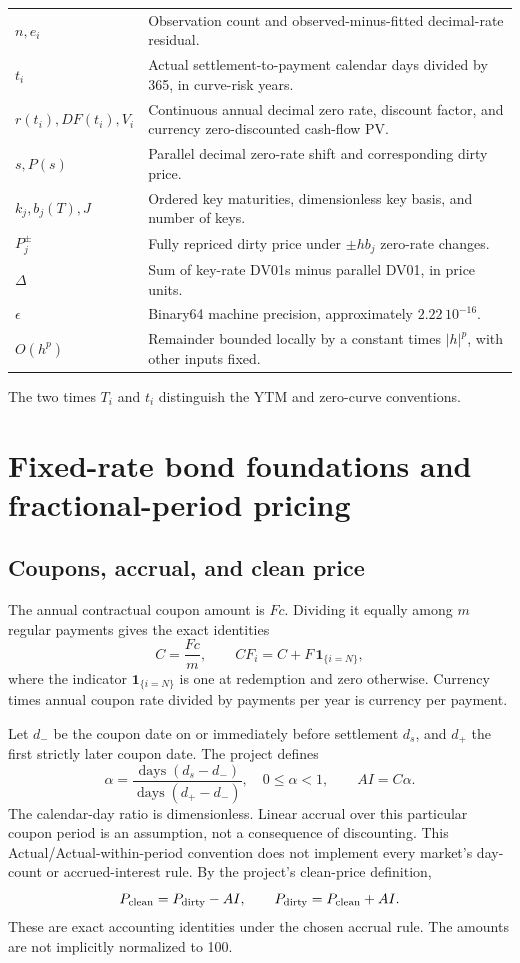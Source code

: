 \documentclass[12pt,a4paper]{article}
\begin{document}
\begin{longtable}{@{}p{}p{}@{}}
$n,e_i$ & Observation count and observed-minus-fitted decimal-rate residual.\\
$t_i$ & Actual settlement-to-payment calendar days divided by 365, in curve-risk years.\\
$r(t_i),DF(t_i),V_i$ & Continuous annual decimal zero rate, discount factor, and currency zero-discounted cash-flow PV.\\
$s,P(s)$ & Parallel decimal zero-rate shift and corresponding dirty price.\\
$k_j,b_j(T),J$ & Ordered key maturities, dimensionless key basis, and number of keys.\\
$P_j^\pm$ & Fully repriced dirty price under $\pm h b_j$ zero-rate changes.\\
$\Delta$ & Sum of key-rate DV01s minus parallel DV01, in price units.\\
$\epsilon$ & Binary64 machine precision, approximately $2.22\,10^{-16}$.\\
$O(h^p)$ & Remainder bounded locally by a constant times $|h|^p$, with other inputs fixed.\\
\bottomrule
\end{longtable}
\normalsize
The two times $T_i$ and $t_i$ distinguish the YTM and zero-curve conventions.

\section{Fixed-rate bond foundations and fractional-period pricing}
\subsection{Coupons, accrual, and clean price}
The annual contractual coupon amount is $Fc$. Dividing it equally among
$m$ regular payments gives the exact identities
\begin{equation}
 C=\frac{Fc}{m},\qquad CF_i=C+F\,\mathbf 1_{\{i=N\}},
\end{equation}
where the indicator $\mathbf 1_{\{i=N\}}$ is one at redemption and zero
otherwise. Currency times annual coupon rate divided by payments per year
is currency per payment.

Let $d_-$ be the coupon date on or immediately before settlement $d_s$,
and $d_+$ the first strictly later coupon date. The project defines
\begin{equation}
 \alpha=\frac{\operatorname{days}(d_s-d_-)}
                   {\operatorname{days}(d_+-d_-)},\quad
 0\leq\alpha<1,\qquad AI=C\alpha.
\end{equation}
The calendar-day ratio is dimensionless. Linear accrual over this particular
coupon period is an assumption, not a consequence of discounting.
This Actual/Actual-within-period convention does not implement every market's
day-count or accrued-interest rule. By the project's clean-price definition,
\begin{equation}
 P_{\rm clean}=P_{\rm dirty}-AI,\qquad
 P_{\rm dirty}=P_{\rm clean}+AI.
\end{equation}
These are exact accounting identities under the chosen accrual rule.
The amounts are not implicitly normalized to 100.
\end{document}
